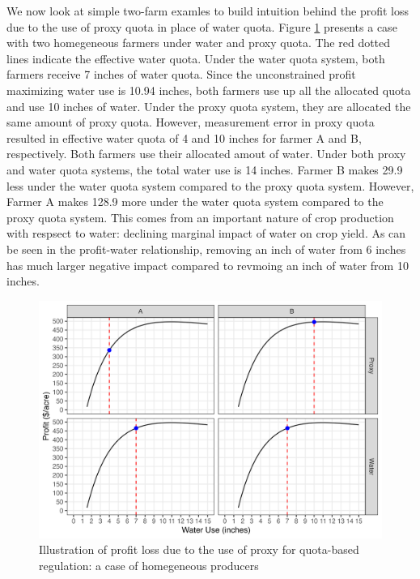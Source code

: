 \documentclass[
]{article}
\begin{document}
We now look at simple two-farm examles to build intuition behind the profit loss due to the use of proxy quota in place of water quota. Figure \ref{fig:illust-homegeneous} presents a case with two homegeneous farmers under water and proxy quota. The red dotted lines indicate the effective water quota. Under the water quota system, both farmers receive 7 inches of water quota. Since the unconstrained profit maximizing water use is 10.94 inches, both farmers use up all the allocated quota and use 10 inches of water. Under the proxy quota system, they are allocated the same amount of proxy quota. However, measurement error in proxy quota resulted in effective water quota of 4 and 10 inches for farmer A and B, respectively. Both farmers use their allocated amout of water. Under both proxy and water quota systems, the total water use is 14 inches. Farmer B makes 29.9 less under the water quota system compared to the proxy quota system. However, Farmer A makes 128.9 more under the water quota system compared to the proxy quota system. This comes from an important nature of crop production with respsect to water: declining marginal impact of water on crop yield. As can be seen in the profit-water relationship, removing an inch of water from 6 inches has much larger negative impact compared to revmoing an inch of water from 10 inches.

\begin{figure}[H]

{\centering \includegraphics{figures/g_illustration_homogeneous} 

}

\caption{Illustration of profit loss due to the use of proxy for quota-based regulation: a case of homegeneous producers}\label{fig:illust-homegeneous}
\end{figure}
\end{document}
